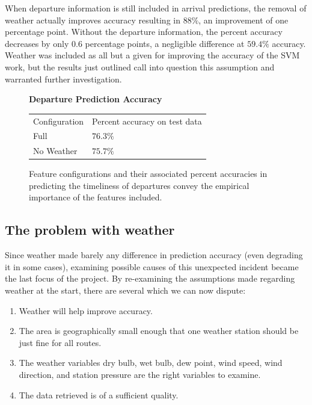 \documentclass[11pt]{article} %
\begin{document}
When departure information is still included in arrival predictions, the removal of 
weather actually improves accuracy resulting in $88\%$, an improvement of one
percentage point. Without the departure information, the percent accuracy decreases
by only $0.6$ percentage points, a negligible difference at $59.4\%$ accuracy. 
Weather was included as all but a given for improving the accuracy of the SVM
work, but the results just outlined call into question this assumption and warranted 
further investigation.

\begin{figure}
    \centering
    \textbf{Departure Prediction Accuracy}

    \begin{tabular}{ll}
        Configuration & Percent accuracy on test data\\
        Full        & $76.3\%$\\
        No Weather  & $75.7\%$\\
    \end{tabular}
    \caption{Feature configurations and their associated percent accuracies in
         predicting the timeliness of departures convey the empirical importance of 
         the features included.}
    \label{fig:second_run_data_departures}
\end{figure}

\subsection{The problem with weather}
\label{sec:weather_prob}
Since weather made barely any difference in prediction accuracy (even 
degrading it in some cases), examining possible causes of this unexpected 
incident became the last focus of the project. By re-examining the assumptions
made regarding weather at the start, there are several which we can now dispute:

\begin{enumerate}
    \item Weather will help improve accuracy.
    \item \label{wAssumption_oneStation} The area is geographically small enough 
        that one weather station should be just fine for all routes.
    \item The weather variables dry bulb, wet bulb, dew point, wind speed, 
        wind direction, and station pressure are the right variables to examine.
    \item The data retrieved is of a sufficient quality.
\end{enumerate}
\end{document}
